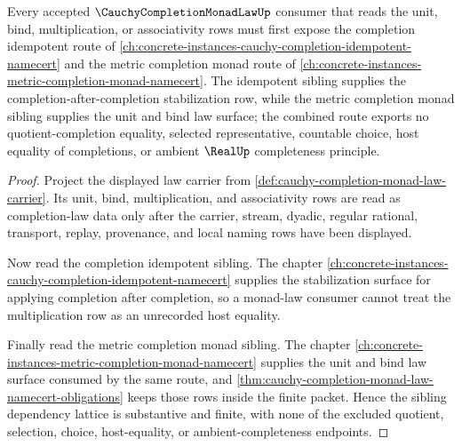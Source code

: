 \begin{lemma}
\label{lem:cauchy-completion-monad-law-idempotent-metric-monad-route}
Every accepted $\CauchyCompletionMonadLawUp$ consumer that reads the unit, bind, multiplication, or associativity rows must first expose the completion idempotent route of \autoref{ch:concrete-instances-cauchy-completion-idempotent-namecert} and the metric completion monad route of \autoref{ch:concrete-instances-metric-completion-monad-namecert}. The idempotent sibling supplies the completion-after-completion stabilization row, while the metric completion monad sibling supplies the unit and bind law surface; the combined route exports no quotient-completion equality, selected representative, countable choice, host equality of completions, or ambient $\RealUp$ completeness principle.
\end{lemma}
\begin{proof}
Project the displayed law carrier from \autoref{def:cauchy-completion-monad-law-carrier}. Its unit, bind, multiplication, and associativity rows are read as completion-law data only after the carrier, stream, dyadic, regular rational, transport, replay, provenance, and local naming rows have been displayed.

Now read the completion idempotent sibling. The chapter \autoref{ch:concrete-instances-cauchy-completion-idempotent-namecert} supplies the stabilization surface for applying completion after completion, so a monad-law consumer cannot treat the multiplication row as an unrecorded host equality.

Finally read the metric completion monad sibling. The chapter \autoref{ch:concrete-instances-metric-completion-monad-namecert} supplies the unit and bind law surface consumed by the same route, and \autoref{thm:cauchy-completion-monad-law-namecert-obligations} keeps those rows inside the finite packet. Hence the sibling dependency lattice is substantive and finite, with none of the excluded quotient, selection, choice, host-equality, or ambient-completeness endpoints.
\end{proof}
